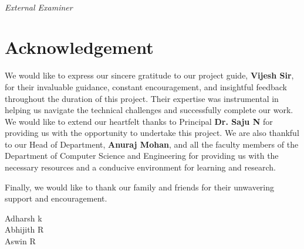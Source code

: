 \documentclass[12pt, a4paper]{report}
\begin{document}
\vspace{2cm} %

\begin{center}
    \begin{minipage}{0.5\textwidth} %
        \centering
        \vspace{2cm} %
        \dotfill \\ %
        \textit{External Examiner}
    \end{minipage}
\end{center}
\chapter*{Acknowledgement}

We would like to express our sincere gratitude to our project guide, \textbf{Vijesh Sir}, for their invaluable guidance, constant encouragement, and insightful feedback throughout the duration of this project. Their expertise was instrumental in helping us navigate the technical challenges and successfully complete our work.
We would like to extend our heartfelt thanks to Principal \textbf{Dr. Saju N} for providing us with the
opportunity to undertake this project.
We are also thankful to our Head of Department, \textbf{Anuraj Mohan}, and all the faculty members of the Department of Computer Science and Engineering for providing us with the necessary resources and a conducive environment for learning and research.

Finally, we would like to thank our family and friends for their unwavering support and encouragement.

\vspace{2cm}
\begin{flushright}
    Adharsh k \\
    Abhijith R \\
    Aswin R \\
\end{flushright}

\newpage


\end{document}
